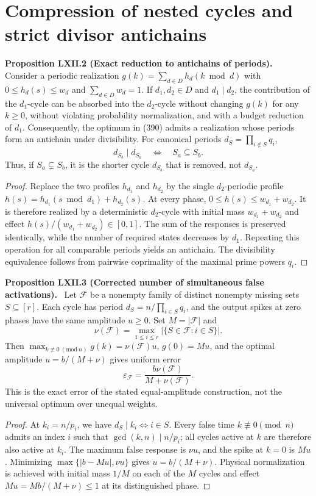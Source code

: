 \documentclass[11pt,a4paper,oneside]{book}
\newcommand{\statement}[3]{\par\medskip\noindent\textbf{#1 #2 (#3).}\ }
\begin{document}
\section{Compression of nested cycles and strict divisor antichains}
\statement{Proposition}{LXII.2}{Exact reduction to antichains of periods}
Consider a periodic realization $g(k)=\sum_{d\in D}h_d(k\bmod d)$ with $0\le h_d(s)\le w_d$ and $\sum_{d\in D}w_d=1$. If $d_1,d_2\in D$ and $d_1\mid d_2$, the contribution of the $d_1$-cycle can be absorbed into the $d_2$-cycle without changing $g(k)$ for any $k\ge0$, without violating probability normalization, and with a budget reduction of $d_1$. Consequently, the optimum in (390) admits a realization whose periods form an antichain under divisibility. For canonical periods $d_S=\prod_{i\notin S}q_i$,
\[
d_{S_b}\mid d_{S_a}\quad\Longleftrightarrow\quad S_a\subseteq S_b.
\]
Thus, if $S_a\subsetneq S_b$, it is the shorter cycle $d_{S_b}$ that is removed, not $d_{S_a}$.
\begin{proof}
Replace the two profiles $h_{d_1}$ and $h_{d_2}$ by the single $d_2$-periodic profile $h(s)=h_{d_1}(s\bmod d_1)+h_{d_2}(s)$. At every phase, $0\le h(s)\le w_{d_1}+w_{d_2}$. It is therefore realized by a deterministic $d_2$-cycle with initial mass $w_{d_1}+w_{d_2}$ and effect $h(s)/(w_{d_1}+w_{d_2})\in[0,1]$. The sum of the responses is preserved identically, while the number of required states decreases by $d_1$. Repeating this operation for all comparable periods yields an antichain. The divisibility equivalence follows from pairwise coprimality of the maximal prime powers $q_i$.
\end{proof}

\statement{Proposition}{LXII.3}{Corrected number of simultaneous false activations}
Let $\mathcal F$ be a nonempty family of distinct nonempty missing sets $S\subseteq[r]$. Each cycle has period $d_S=n/\prod_{i\in S}q_i$, and the output spikes at zero phases have the same amplitude $u\ge0$. Set $M=|\mathcal F|$ and
\[
\nu(\mathcal F)=\max_{1\le i\le r}|\{S\in\mathcal F:i\in S\}|.
\]
Then $\max_{k\not\equiv0\ (\mathrm{mod}\ n)}g(k)=\nu(\mathcal F)u$, $g(0)=Mu$, and the optimal amplitude $u=b/(M+\nu)$ gives uniform error
\[
\varepsilon_{\mathcal F}=\frac{b\nu(\mathcal F)}{M+\nu(\mathcal F)}.
\]
This is the exact error of the stated equal-amplitude construction, not the universal optimum over unequal weights.
\begin{proof}
At $k_i=n/p_i$, we have $d_S\mid k_i\Longleftrightarrow i\in S$. Every false time $k\not\equiv0\pmod n$ admits an index $i$ such that $\gcd(k,n)\mid n/p_i$; all cycles active at $k$ are therefore also active at $k_i$. The maximum false response is $\nu u$, and the spike at $k=0$ is $Mu$. Minimizing $\max\{|b-Mu|,\nu u\}$ gives $u=b/(M+\nu)$. Physical normalization is achieved with initial mass $1/M$ on each of the $M$ cycles and effect $Mu=Mb/(M+\nu)\le1$ at its distinguished phase.
\end{proof}
\end{document}
